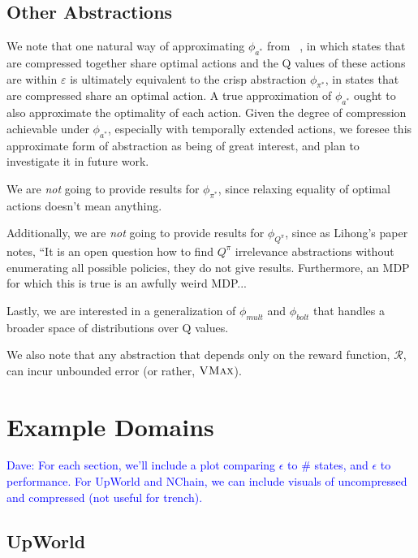 \documentclass{article}
\newcommand\dnote[1]{\textcolor{blue}{Dave: #1}}
\begin{document}
\subsection{Other Abstractions}

We note that one natural way of approximating $\phi_{a^*}$ from ~\cite{li2006towards}, in which states that are compressed together share optimal actions and the Q values of these actions are within $\varepsilon$ is ultimately equivalent to the crisp abstraction $\phi_{\pi^*}$, in states that are compressed share an optimal action. A true approximation of $\phi_{a^*}$ ought to also approximate the optimality of each action. Given the degree of compression achievable under $\phi_{a^*}$, especially with temporally extended actions, we foresee this approximate form of abstraction as being of great interest, and plan to investigate it in future work.

We are {\it not} going to provide results for $\phi_{\pi^*}$, since relaxing equality of optimal actions doesn't mean anything.

Additionally, we are {\it not} going to provide results for $\phi_{Q^\pi}$, since as Lihong's paper notes, ``It is an open question how to find $Q^\pi$ irrelevance abstractions without enumerating all possible policies, they do not give results. Furthermore, an MDP for which this is true is an awfully weird MDP...

Lastly, we are interested in a generalization of $\phi_{mult}$  and $\phi_{bolt}$ that handles a broader space of distributions over Q values.

We also note that any abstraction that depends only on the reward function, $\mathcal{R}$, can incur unbounded error (or rather, $\textsc{VMax}$).




\section{Example Domains}

\dnote{For each section, we'll include a plot comparing $\epsilon$ to \# states, and $\epsilon$ to performance. For UpWorld and NChain, we can include visuals of uncompressed and compressed (not useful for trench).}

\subsection{UpWorld}
\end{document}
